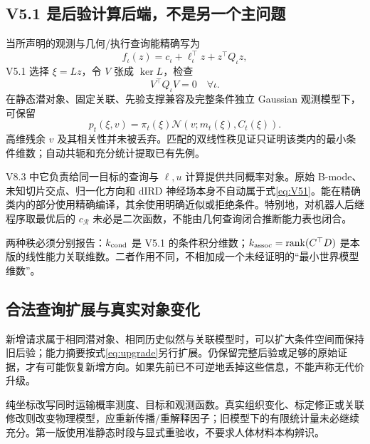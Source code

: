 \documentclass[UTF8,11pt,a4paper,fontset=fandol]{ctexart}
\numberwithin{equation}{section}
\theoremstyle{definition}
\newcommand{\N}{\mathcal N}
\DeclareMathOperator{\rank}{rank}
\begin{document}
\subsection{V5.1 是后验计算后端，不是另一个主问题}
当所声明的观测与几何/执行查询能精确写为
\begin{equation}
f_\iota(z)=c_\iota+\ell_\iota^\top z+z^\top Q_\iota z,
\end{equation}
V5.1 选择 $\xi=Lz$，令 $V$ 张成 $\ker L$，检查
\begin{equation}
V^\top Q_\iota V=0\quad\forall\iota.
\label{eq:V51}
\end{equation}
在静态潜对象、固定关联、先验支撑兼容及完整条件独立 Gaussian 观测模型下，可保留
\begin{equation}
p_t(\xi,v)=\pi_t(\xi)\N(v;m_t(\xi),C_t(\xi)).
\end{equation}
高维残余 $v$ 及其相关性并未被丢弃。匹配的双线性秩见证只证明该类内的最小条件维数\cite{v51}；自动共轭和充分统计提取已有先例\cite{autoconj}。

V8.3 中它负责给同一目标的查询与 $\ell,u$ 计算提供共同概率对象。原始 B-mode、未知切片交点、归一化方向和 dIRD 神经场本身不自动属于式\eqref{eq:V51}。能在精确类内的部分使用精确编译，其余使用明确近似或拒绝条件。特别地，对机器人后继程序取最优后的 $c_{\mathcal R}$ 未必是二次函数，不能由几何查询闭合推断能力表也闭合。

两种秩必须分别报告：$k_{\rm cond}$ 是 V5.1 的条件积分维数；$k_{\rm assoc}=\rank(C^\top D)$ 是本版的线性能力关联维数。二者作用不同，不相加成一个未经证明的“最小世界模型维数”。

\subsection{合法查询扩展与真实对象变化}
新增请求属于相同潜对象、相同历史似然与关联模型时，可以扩大条件空间而保持旧后验；能力摘要按式\eqref{eq:upgrade}另行扩展。仍保留完整后验或足够的原始证据，才有可能恢复新增方向。如果先前已不可逆地丢掉这些信息，不能声称无代价升级。

纯坐标改写同时运输概率测度、目标和观测函数。真实组织变化、标定修正或关联修改则改变物理模型，应重新传播/重解释因子；旧模型下的有限统计量未必继续充分。第一版使用准静态时段与显式重验收，不要求人体材料本构辨识。
\end{document}

